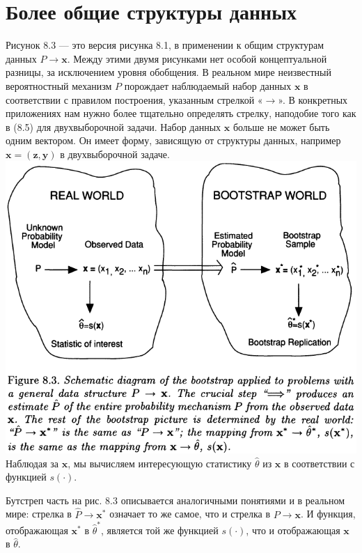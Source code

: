 \section{Более общие структуры данных}

Рисунок 8.3 --- это версия рисунка 8.1, в применении к общим структурам данных $P \to \textbf{x}$. Между этими двумя рисунками нет особой концептуальной разницы, за исключением уровня обобщения. В реальном мире неизвестный вероятностный механизм $P$ порождает наблюдаемый набор данных $\textbf{x}$ в соответствии с правилом построения, указанным стрелкой «$\to$». В конкретных приложениях нам нужно более тщательно определять стрелку, наподобие того как в (8.5) для двухвыборочной задачи. Набор данных $\textbf{x}$ больше не может быть одним вектором. Он имеет форму, зависящую от структуры данных, например $\textbf{x} = (\textbf{z}, \textbf{y})$ в двухвыборочной задаче.\\
\noindent
\includegraphics[width=\linewidth]{8/f83}
\newline
\noindent Наблюдая за $\textbf{x}$, мы вычисляем интересующую статистику $\hat{\theta}$ из $\textbf{x}$ в соответствии с функцией $s(\cdot)$.

Бутстреп часть на рис. 8.3 описывается аналогичными понятиями и в реальном мире: стрелка в $\hat{P} \to \textbf{x}^*$ означает то же самое, что и стрелка в $P \to \textbf{x}$. И функция, отображающая $\textbf{x}^*$ в $\hat{\theta}^*$, является той же функцией $s(\cdot)$, что и отображающая $\textbf{x}$ в $\hat{\theta}$. 


